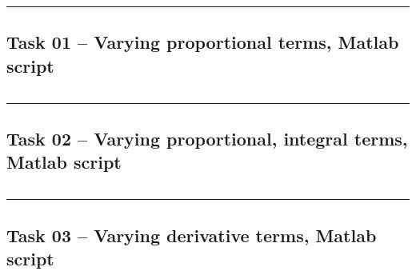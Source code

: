 \documentclass[12pt]{article}
\def\hr{{\par\noindent\rule{\textwidth}{0.4pt}}}
\begin{document}
\hr{}

\subsection{Task 01 -- Varying proportional terms, Matlab script}\label{sap:vary p}
\inputminted{matlab}{src/lab09_task01_vary_p.m}

\hr{}

\subsection{Task 02 -- Varying proportional, integral terms, Matlab script}\label{sap:vary pi}
\inputminted{matlab}{src/lab09_task02_vary_i.m}

\hr{}

\subsection{Task 03 -- Varying derivative terms, Matlab script}\label{sap:vary d}
\inputminted{matlab}{src/lab09_task03_vary_d.m}
\end{document}

